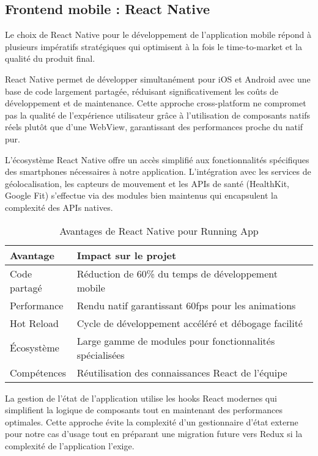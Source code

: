 \subsection{Frontend mobile : React Native}

Le choix de React Native pour le développement de l'application mobile répond à plusieurs impératifs stratégiques qui optimisent à la fois le time-to-market et la qualité du produit final.

React Native permet de développer simultanément pour iOS et Android avec une base de code largement partagée, réduisant significativement les coûts de développement et de maintenance. Cette approche cross-platform ne compromet pas la qualité de l'expérience utilisateur grâce à l'utilisation de composants natifs réels plutôt que d'une WebView, garantissant des performances proche du natif pur.

L'écosystème React Native offre un accès simplifié aux fonctionnalités spécifiques des smartphones nécessaires à notre application. L'intégration avec les services de géolocalisation, les capteurs de mouvement et les APIs de santé (HealthKit, Google Fit) s'effectue via des modules bien maintenus qui encapsulent la complexité des APIs natives.

\begin{table}[h]
\centering
\begin{tabular}{|l|p{10cm}|}
\hline
\textbf{Avantage} & \textbf{Impact sur le projet} \\
\hline
Code partagé & Réduction de 60\% du temps de développement mobile \\
\hline
Performance & Rendu natif garantissant 60fps pour les animations \\
\hline
Hot Reload & Cycle de développement accéléré et débogage facilité \\
\hline
Écosystème & Large gamme de modules pour fonctionnalités spécialisées \\
\hline
Compétences & Réutilisation des connaissances React de l'équipe \\
\hline
\end{tabular}
\caption{Avantages de React Native pour Running App}
\end{table}

La gestion de l'état de l'application utilise les hooks React modernes qui simplifient la logique de composants tout en maintenant des performances optimales. Cette approche évite la complexité d'un gestionnaire d'état externe pour notre cas d'usage tout en préparant une migration future vers Redux si la complexité de l'application l'exige.

